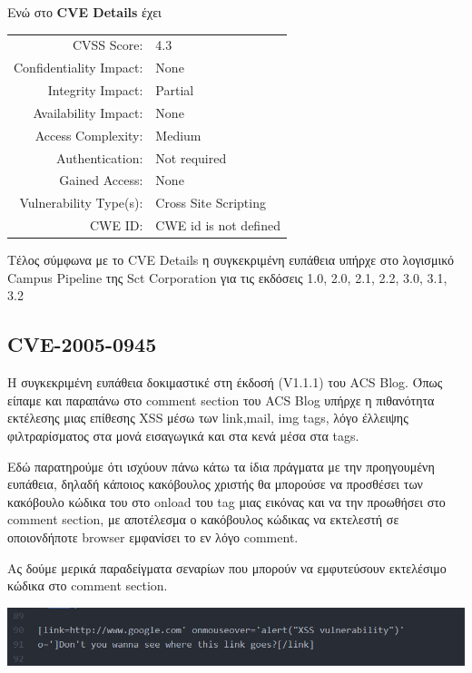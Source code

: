 \noindent
Ενώ στο \textbf{CVE Details} έχει 


\begin{tabular}{rl}
\hline
CVSS Score: & 	4.3\\
Confidentiality Impact: & \noindent None \\
Integrity Impact: & Partial \\
Availability Impact:  &	None \\
Access Complexity: &	Medium \\
Authentication: 	& Not required \\
Gained Access: 	& None\\
Vulnerability Type(s): & 	Cross Site Scripting	\\
CWE ID: &	CWE id is not defined \\
\hline
\end{tabular}


\noindent
Τέλος σύμφωνα με το CVE Details η συγκεκριμένη ευπάθεια υπήρχε στο λογισμικό Campus Pipeline της Sct Corporation για τις εκδόσεις 1.0, 2.0, 2.1, 2.2, 3.0, 3.1, 3.2

\subsection{CVE-2005-0945}
\noindent 
Η συγκεκριμένη ευπάθεια δοκιμαστικέ στη έκδοσή (V1.1.1) του ACS Blog. Όπως είπαμε και παραπάνω στο comment section του ACS Blog υπήρχε η πιθανότητα εκτέλεσης μιας επίθεσης XSS μέσω των link,mail, img tags, λόγο έλλειψης φιλτραρίσματος στα μονά εισαγωγικά και στα κενά μέσα στα tags. 

\noindent
Εδώ παρατηρούμε ότι ισχύουν πάνω κάτω τα ίδια πράγματα με την προηγουμένη ευπάθεια, δηλαδή κάποιος κακόβουλος χριστής θα μπορούσε να προσθέσει των κακόβουλο κώδικα του στο onload του tag μιας εικόνας και να την προωθήσει στο comment section, με αποτέλεσμα ο κακόβουλος κώδικας να εκτελεστή σε οποιονδήποτε browser εμφανίσει το εν λόγο comment.

\noindent
Ας δούμε μερικά παραδείγματα σεναρίων που μπορούν να εμφυτεύσουν εκτελέσιμο κώδικα στο comment section.

\begin{center}
			\includegraphics[width=1\textwidth]{image/27.PNG}		
\end{center}

